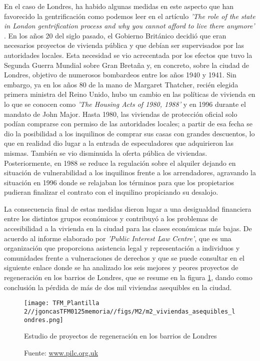\documentclass[12pt,a4paper,twoside]{book}
\begin{document}
En el caso de Londres, ha habido algunas medidas en este aspecto que han favorecido la gentrificación como podemos leer en el artículo \textit{'The role of the state in London gentrification process and why you cannot afford to live there anymore'} \cite{wdenekamp_role_2024}. En los años 20 del siglo pasado, el Gobierno Británico decidió que eran necesarios proyectos de vivienda pública y que debían ser supervisados por las autoridades locales. Esta necesidad se vio acrecentada por los efectos que tuvo la Segunda Guerra Mundial sobre Gran Bretaña y, en concreto, sobre la ciudad de Londres, objetivo de numerosos bombardeos entre los años 1940 y 1941.
Sin embargo, ya en los años 80 de la mano de Margaret Thatcher, recién elegida primera ministra del Reino Unido, hubo un cambio en las políticas de vivienda en lo que se conocen como \textit{'The Housing Acts of 1980, 1988'} y en 1996 durante el mandato de John Major. Hasta 1980, las viviendas de protección oficial solo podían comprarse con permiso de las autoridades locales; a partir de esa fecha se dio la posibilidad a los inquilinos de comprar sus casas con grandes descuentos, lo que en realidad dio lugar a la entrada de especuladores que adquirieron las mismas. También se vio disminuida la oferta pública de viviendas. Posteriormente, en 1988 se reduce la regulación sobre el alquiler dejando en situación de vulnerabilidad a los inquilinos frente a los arrendadores, agravando la situación en 1996 donde se relajaban los términos para que los propietarios pudieran finalizar el contrato con el inquilino propiciando su desalojo.

La consecuencia final de estas medidas dieron lugar a una desigualdad financiera entre los distintos grupos económicos y contribuyó a los problemas de accesibilidad a la vivienda en la ciudad para las clases económicas más bajas. De acuerdo al informe elaborado por \textit{'Public Interest Law Centre'}, que es una organización que proporciona asistencia legal y representación a individuos y comunidades frente a vulneraciones de derechos y que se puede consultar en el siguiente enlace \cite{penny_report_2024} donde se ha analizado los seis mejores y peores proyectos de regeneración en los barrios de Londres, que se resume en la figura \ref{fig:fig_regeneracion_viviendas_londres}, dando como conclusión la pérdida de más de dos mil viviendas asequibles en la ciudad.

\begin{figure}[H]
    \centering
    \texttt{[image: TFM\_Plantilla 2//jgoncasTFM0125memoria//figs/M2/m2\_viviendas\_asequibles\_londres.png]}
    \caption{Estudio de proyectos de regeneración en los barrios de Londres}
    \caption*{Fuente: \href{https://www.pilc.org.uk/news/affordable-housing-increases-rents-for-low-income-londoners/}{www.pilc.org.uk}}
    \label{fig:fig_regeneracion_viviendas_londres}
\end{figure}
\end{document}
